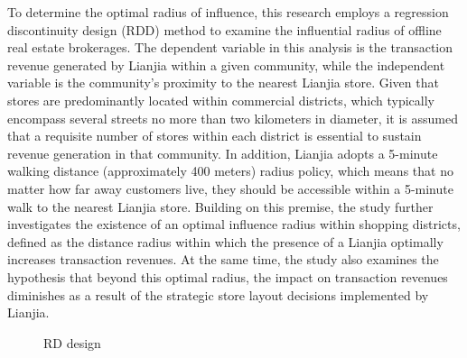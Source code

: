 \documentclass[12pt]{article}
\begin{document}
To determine the optimal radius of influence, this research employs a regression discontinuity design (RDD) method to examine the influential radius of offline real estate brokerages. The dependent variable in this analysis is the transaction revenue generated by Lianjia within a given community, while the independent variable is the community's proximity to the nearest Lianjia store. Given that stores are predominantly located within commercial districts, which typically encompass several streets no more than two kilometers in diameter, it is assumed that a requisite number of stores within each district is essential to sustain revenue generation in that community. In addition, Lianjia adopts a 5-minute walking distance (approximately 400 meters) radius policy, which means that no matter how far away customers live, they should be accessible within a 5-minute walk to the nearest Lianjia store. Building on this premise, the study further investigates the existence of an optimal influence radius within shopping districts, defined as the distance radius within which the presence of a Lianjia optimally increases transaction revenues. At the same time, the study also examines the hypothesis that beyond this optimal radius, the impact on transaction revenues diminishes as a result of the strategic store layout decisions implemented by Lianjia.

\begin{figure}[ht]
    \centering
    \hfill %
    \hfill %
    \caption{RD design}
    \label{fig:RD_design}
\end{figure}
\end{document}
